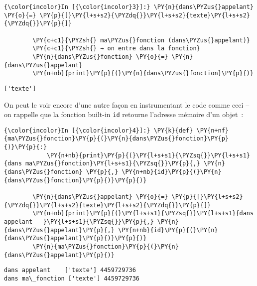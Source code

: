     \begin{Verbatim}[commandchars=\\\{\}]
{\color{incolor}In [{\color{incolor}3}]:} \PY{n}{dans\PYZus{}appelant} \PY{o}{=} \PY{p}{[}\PY{l+s+s2}{\PYZdq{}}\PY{l+s+s2}{texte}\PY{l+s+s2}{\PYZdq{}}\PY{p}{]}
        
        \PY{c+c1}{\PYZsh{} ma\PYZus{}fonction (dans\PYZus{}appelant)}
        \PY{c+c1}{\PYZsh{} → on entre dans la fonction}
        \PY{n}{dans\PYZus{}fonction} \PY{o}{=} \PY{n}{dans\PYZus{}appelant}
        \PY{n+nb}{print}\PY{p}{(}\PY{n}{dans\PYZus{}fonction}\PY{p}{)}
\end{Verbatim}


    \begin{Verbatim}[commandchars=\\\{\}]
['texte']

    \end{Verbatim}

    On peut le voir encore d'une autre façon en instrumentant le code comme
ceci -- on rappelle que la fonction built-in \texttt{id} retourne
l'adresse mémoire d'un objet~:

    \begin{Verbatim}[commandchars=\\\{\}]
{\color{incolor}In [{\color{incolor}4}]:} \PY{k}{def} \PY{n+nf}{ma\PYZus{}fonction}\PY{p}{(}\PY{n}{dans\PYZus{}fonction}\PY{p}{)}\PY{p}{:}
            \PY{n+nb}{print}\PY{p}{(}\PY{l+s+s1}{\PYZsq{}}\PY{l+s+s1}{dans ma\PYZus{}fonction}\PY{l+s+s1}{\PYZsq{}}\PY{p}{,} \PY{n}{dans\PYZus{}fonction} \PY{p}{,} \PY{n+nb}{id}\PY{p}{(}\PY{n}{dans\PYZus{}fonction}\PY{p}{)}\PY{p}{)}
            
        \PY{n}{dans\PYZus{}appelant} \PY{o}{=} \PY{p}{[}\PY{l+s+s2}{\PYZdq{}}\PY{l+s+s2}{texte}\PY{l+s+s2}{\PYZdq{}}\PY{p}{]}
        \PY{n+nb}{print}\PY{p}{(}\PY{l+s+s1}{\PYZsq{}}\PY{l+s+s1}{dans appelant   }\PY{l+s+s1}{\PYZsq{}}\PY{p}{,} \PY{n}{dans\PYZus{}appelant}\PY{p}{,} \PY{n+nb}{id}\PY{p}{(}\PY{n}{dans\PYZus{}appelant}\PY{p}{)}\PY{p}{)}
        \PY{n}{ma\PYZus{}fonction}\PY{p}{(}\PY{n}{dans\PYZus{}appelant}\PY{p}{)}
\end{Verbatim}


    \begin{Verbatim}[commandchars=\\\{\}]
dans appelant    ['texte'] 4459729736
dans ma\_fonction ['texte'] 4459729736

    \end{Verbatim}


